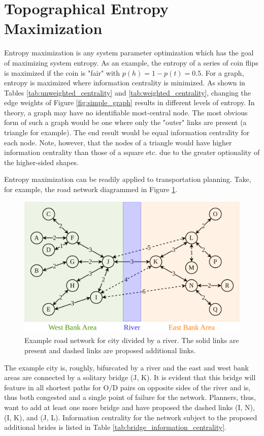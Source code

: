 \section{Topographical Entropy Maximization}

Entropy maximization is any system parameter optimization which has the goal of maximizing system entropy. As an example, the entropy of a series of coin flips is maximized if the coin is "fair" with $p(h) = 1 - p(t) = 0.5$. For a graph, entropy is maximized where information centrality is minimized. As shown in Tables \ref{tab:unweighted_centrality} and \ref{tab:weighted_centrality}, changing the edge weights of Figure \ref{fig:simple_graph} results in different levels of entropy. In theory, a graph may have no identifiable most-central node. The most obvious form of such a graph would be one where only the "outer" links are present (a triangle for example). The end result would be equal information centrality for each node. Note, however, that the nodes of a triangle would have higher information centrality than those of a square etc. due to the greater optionality of the higher-sided shapes.

Entropy maximization can be readily applied to transportation planning. Take, for example, the road network diagrammed in Figure \ref{fig:divided_network}.

\begin{figure}[H]
	\centering
	\includegraphics[width = .8\linewidth]{figs/divided_network.png}
	\caption{Example road network for city divided by a river. The solid links are present and dashed links are proposed additional links.}
	\label{fig:divided_network}
\end{figure}

The example city is, roughly, bifurcated by a river and the east and west bank areas are connected by a solitary bridge (J, K). It is evident that this bridge will feature in all shortest paths for O/D pairs on opposite sides of the river and is, thus both congested and a single point of failure for the network. Planners, thus, want to add at least one more bridge and have proposed the dashed links (I, N), (I, K), and (J, L). Information centrality for the network subject to the proposed additional brides is listed in Table \ref{tab:bridge_information_centrality}.

